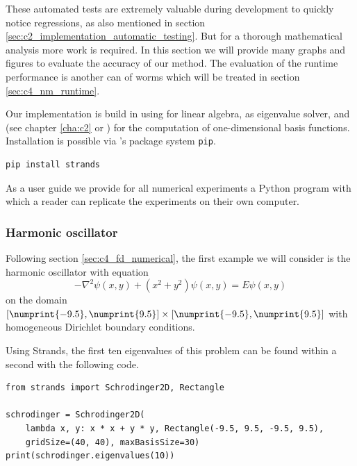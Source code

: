 These automated tests are extremely valuable during development to quickly notice regressions, as also mentioned in section \ref{sec:c2_implementation_automatic_testing}. But for a thorough mathematical analysis more work is required. In this section we will provide many graphs and figures to evaluate the accuracy of our method. The evaluation of the runtime performance is another can of worms which will be treated in section \ref{sec:c4_nm_runtime}.

Our implementation is build in \cpp{} using \Eigen{} \cite{guennebaud_eigen_2010} for linear algebra, \spectra{} \cite{qiu_yixuan_2022} as eigenvalue solver, and  (see chapter \ref{cha:c2} or \cite{baeyens_fast_2020}) for the computation of one-dimensional basis functions. Installation is possible via \lpython{}'s package system \texttt{pip}.
\begin{verbatim}
pip install strands
\end{verbatim}

As a user guide we provide for all numerical experiments a Python program with which a reader can replicate the experiments on their own computer.

\subsubsection{Harmonic oscillator}\label{sec:c4_numerical_harmonic}

Following section \ref{sec:c4_fd_numerical}, the first example we will consider is the harmonic oscillator with equation
\begin{equation}\label{equ:c4_nm_harmonic}
    -\nabla^2 \psi(x, y) + \left(x^2 + y^2\right) \psi(x, y) = E \psi(x, y)
\end{equation}
on the domain $[\numprint{-9.5}, \numprint{9.5}] \times [\numprint{-9.5}, \numprint{9.5}]$ with homogeneous Dirichlet boundary conditions.

Using Strands, the first ten eigenvalues of this problem can be found within a second with the following code.
\begin{verbatim}
from strands import Schrodinger2D, Rectangle

schrodinger = Schrodinger2D(
    lambda x, y: x * x + y * y, Rectangle(-9.5, 9.5, -9.5, 9.5),
    gridSize=(40, 40), maxBasisSize=30)
print(schrodinger.eigenvalues(10))
\end{verbatim}



